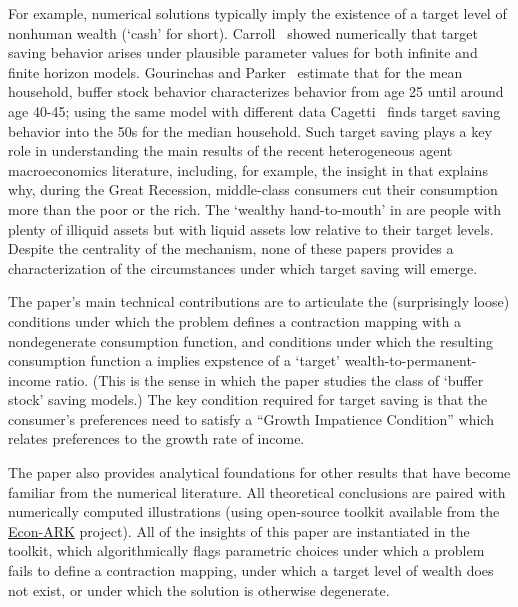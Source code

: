 \documentclass[titlepage]{\econtex}\providecommand{\texname}{BufferStockTheory}
\begin{document}
For example, numerical solutions typically imply the existence of a target level of nonhuman wealth (`cash' for short).  Carroll~\citeyearpar{carrollBrookings,carrollBSLCPIH} showed numerically that target saving behavior arises under plausible parameter values for both infinite and finite horizon models.  Gourinchas and Parker~\citeyearpar{gpLifeCycle} estimate that for the mean household, buffer stock behavior characterizes behavior from age 25 until around age 40-45; using the same model with different data Cagetti~\citeyearpar{cagettiWprofiles} finds target saving behavior into the 50s for the median household.  Such target saving plays a key role in understanding the main results of the recent heterogeneous agent macroeconomics literature, including, for example, the insight in \cite{kmpHandbook} that explains why, during the Great Recession, middle-class consumers cut their consumption more than the poor or the rich.  The `wealthy hand-to-mouth' in \cite{kaplanViolanteWeidner_wealthyH2M} are people with plenty of illiquid assets but with liquid assets low relative to their target levels.  Despite the centrality of the mechanism, none of these papers provides a characterization of the circumstances under which target saving will emerge. 

The paper's main technical contributions are to articulate the (surprisingly loose) conditions under which the problem defines a contraction mapping with a nondegenerate consumption function, and conditions under which the resulting consumption function a implies expstence of a `target' wealth-to-permanent-income ratio.  (This is the sense in which the paper studies the class of `buffer stock' saving models.)  The key condition required for target saving is that the consumer's preferences need to satisfy a ``Growth Impatience Condition'' which relates preferences to the growth rate of income.

The paper also provides analytical foundations for other results that have become familiar from the numerical literature.  All theoretical conclusions are paired with numerically computed illustrations (using open-source toolkit available from the \href{https://github.com/econ-ark/REMARK/blob/master/REMARKs/BufferStockTheory/BufferStockTheory.ipynb}{Econ-ARK} project).  All of the insights of this paper are instantiated in the toolkit, which algorithmically flags parametric choices under which a problem fails to define a contraction mapping, under which a target level of wealth does not exist, or under which the solution is otherwise degenerate.
\end{document}
